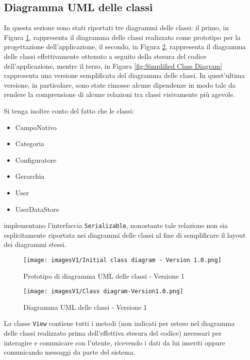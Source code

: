 \newpage
\subsection{Diagramma UML delle classi}
In questa sezione sono stati riportati tre diagrammi delle classi: il primo, in Figura \ref{fig:Initial Class diagram}, rappresenta il diagramma delle classi realizzato come prototipo per la progettazione dell'applicazione, il secondo, in Figura \ref{fig:Class diagram}, rappresenta il diagramma delle classi effettivamente ottenuto a seguito della stesura del codice dell'applicazione, mentre il terzo, in Figura \ref{fig:Simplified Class Diagram} rappresenta una versione semplificata del diagramma delle classi. In quest'ultima versione, in particolare, sono state rimosse alcune dipendenze in modo tale da rendere la comprensione di alcune relazioni tra classi visivamente più agevole.

Si tenga inoltre conto del fatto che le classi:
\begin{itemize}
    \item CampoNativo
    \item Categoria
    \item Configuratore
    \item Gerarchia
    \item User
    \item UserDataStore
\end{itemize}
implementano l'interfaccia \texttt{Serializable}, nonostante tale relazione non sia esplicitamente riportata nei diagrammi delle classi al fine di semplificare il layout dei diagrammi stessi.

\begin{figure}[hb]
    \centering
    \texttt{[image: imagesV1/Initial class diagram - Version 1.0.png]}
    \caption{\label{fig:Initial Class diagram}Prototipo di diagramma UML delle classi - Versione 1}
\end{figure}

\begin{figure}[h!]
    \centering
    \texttt{[image: imagesV1/Class diagram-Version1.0.png]}
    \caption{\label{fig:Class diagram}Diagramma UML delle classi - Versione 1}
\end{figure}    

La classe \texttt{View} contiene tutti i metodi (non indicati per esteso nel diagramma delle classi realizzato prima dell'effettiva stesura del codice) necessari per interagire e comunicare con l'utente, ricevendo i dati da lui inseriti oppure comunicando messaggi da parte del sistema.

